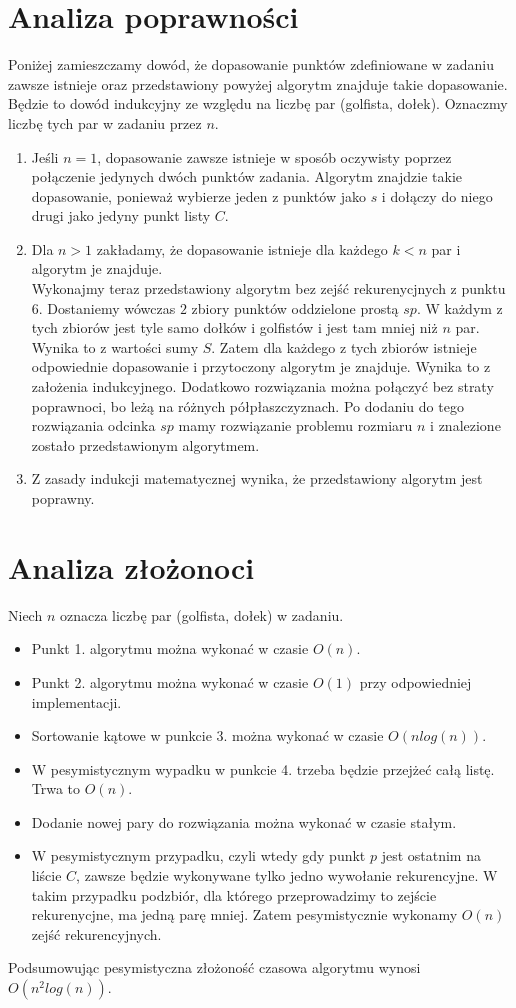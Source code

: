 \documentclass{article}
\begin{document}
\section{Analiza poprawności}
Poniżej zamieszczamy dowód, że dopasowanie punktów zdefiniowane w zadaniu zawsze istnieje oraz przedstawiony powyżej algorytm znajduje takie dopasowanie. Będzie to dowód indukcyjny ze względu na liczbę par (golfista, dołek). 
Oznaczmy liczbę tych par w zadaniu przez $n$. 

\begin{enumerate}
\item Jeśli $n=1$, dopasowanie zawsze istnieje w sposób oczywisty poprzez połączenie jedynych dwóch punktów zadania. Algorytm znajdzie takie dopasowanie, ponieważ wybierze jeden z punktów jako $s$ i dołączy do niego drugi jako jedyny punkt listy $C$.
\item Dla $n>1$ zakładamy, że dopasowanie istnieje dla każdego $k<n$ par i algorytm je znajduje.\\
Wykonajmy teraz przedstawiony algorytm bez zejść rekurenycjnych z punktu 6. Dostaniemy wówczas $2$ zbiory punktów oddzielone prostą $sp$. W każdym z tych zbiorów jest tyle samo dołków i golfistów i jest tam mniej niż $n$ par. Wynika to z wartości sumy $S$. Zatem dla każdego z tych zbiorów istnieje odpowiednie dopasowanie i przytoczony algorytm je znajduje. Wynika to z założenia indukcyjnego. Dodatkowo rozwiązania można połączyć bez straty poprawnoci, bo leżą na różnych półpłaszczyznach. Po dodaniu do tego rozwiązania odcinka $sp$ mamy rozwiązanie problemu rozmiaru $n$ i znalezione zostało przedstawionym algorytmem.
\item Z zasady indukcji matematycznej wynika, że przedstawiony algorytm jest poprawny.
\end{enumerate}


\section{Analiza złożonoci}
Niech $n$ oznacza liczbę par (golfista, dołek) w zadaniu.
\begin{itemize}
\item Punkt 1. algorytmu można wykonać w czasie $O(n)$.
\item Punkt 2. algorytmu można wykonać w czasie $O(1)$ przy odpowiedniej implementacji.
\item Sortowanie kątowe w punkcie 3. można wykonać w czasie $O(nlog(n))$.
\item W pesymistycznym wypadku w punkcie 4. trzeba będzie przejżeć całą listę. Trwa to $O(n)$.
\item Dodanie nowej pary do rozwiązania można wykonać w czasie stałym.
\item W pesymistycznym przypadku, czyli wtedy gdy punkt $p$ jest ostatnim na liście $C$, zawsze będzie wykonywane tylko jedno wywołanie rekurencyjne. W takim przypadku podzbiór, dla którego przeprowadzimy to zejście rekurenycjne, ma jedną parę mniej. Zatem pesymistycznie wykonamy $O(n)$ zejść rekurencyjnych.
\end{itemize}
Podsumowując pesymistyczna złożoność czasowa algorytmu wynosi $O(n^2log(n))$.
\end{document}
